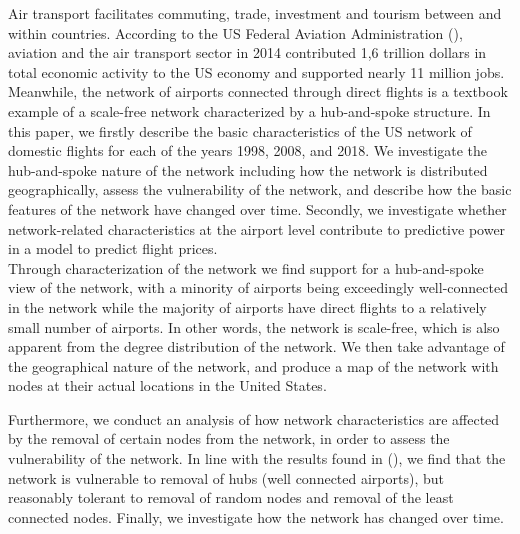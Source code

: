 \label{sec:intro}



Air transport facilitates commuting, trade, investment and tourism between and within countries. According to the US Federal Aviation Administration (\citet{FAA}), aviation and the air transport sector in 2014 contributed 1,6 trillion dollars in total economic activity to the US economy and supported nearly 11 million jobs. Meanwhile, the network of airports connected through direct flights is a textbook example of a scale-free network characterized by a hub-and-spoke structure. In this paper, we firstly describe the basic characteristics of the US network of domestic flights for each of the years 1998, 2008, and 2018. We investigate the hub-and-spoke nature of the network including how the network is distributed geographically, assess the vulnerability of the network, and describe how the basic features of the network have changed over time. Secondly, we investigate whether network-related characteristics at the airport level contribute to predictive power in a model to predict flight prices.
\medskip\\
Through characterization of the network we find support for a hub-and-spoke view of the network, with a minority of airports being exceedingly well-connected in the network while the majority of airports have direct flights to a relatively small number of airports. In other words, the network is scale-free, which is also apparent from the degree distribution of the network. We then take advantage of the geographical nature of the network, and produce a map of the network with nodes at their actual locations in the United States.
\par
Furthermore, we conduct an analysis of how network characteristics are affected by the removal of certain nodes from the network, in order to assess the vulnerability of the network. In line with the results found in (\cite{chi2004structural}), we find that the network is vulnerable to removal of hubs (well connected airports), but reasonably tolerant to removal of random nodes and removal of the least connected nodes. Finally, we investigate how the network has changed over time. 
